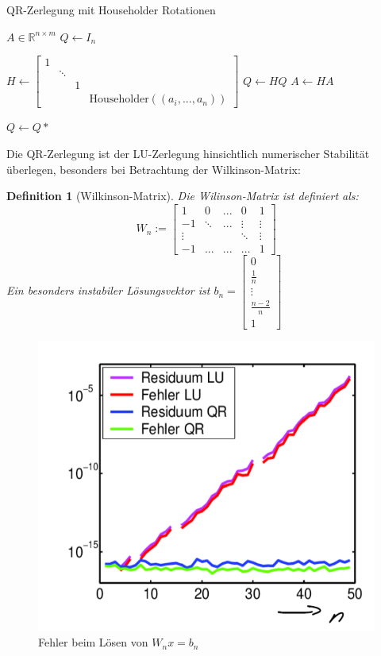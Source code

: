 \documentclass[10pt,a4paper]{article}
\newtheorem{definition}{Definition}
\begin{document}
	\begin{algorithm}
		\caption{QR-Zerlegung mit Householder Rotationen}
		\begin{algorithmic}
			\Require \Require $A \in \mathbb{R}^{n\times m}$
			\State $Q \leftarrow I_n$
			
			\State $H \leftarrow \begin{bmatrix}
				1 & & &    \\
				& \ddots & & \\
				& & 1 & \\
				& & & \text{Householder}((a_i, ..., a_n))
			\end{bmatrix}$
			\State $Q \leftarrow HQ$
			\State $A \leftarrow HA$
			
			\EndFor
			\State $Q \leftarrow Q*$
		\end{algorithmic}
	\end{algorithm}
	Die QR-Zerlegung ist der LU-Zerlegung hinsichtlich numerischer Stabilität überlegen, besonders bei Betrachtung der Wilkinson-Matrix:
	\begin{definition}[Wilkinson-Matrix]
		Die Wilinson-Matrix ist definiert als:
		$$W_n := \begin{bmatrix}
			1 & 0 & ... & 0 & 1\\
			-1 & \ddots & ... & \vdots & \vdots\\
			\vdots& & & \ddots & \vdots\\
			-1 & ... & ... & \dots&1
		\end{bmatrix}$$
		Ein besonders instabiler Lösungsvektor ist $b_n = \begin{bmatrix}
			0\\
			\frac{1}{n}\\
			\vdots\\
			\frac{n-2}{n}\\
			1
		\end{bmatrix}$
	\end{definition}
	\begin{figure}
		\centering
		\includegraphics{"FehlerWilkinson.png"}
		\caption{Fehler beim Lösen von $W_nx =b_n$}
	\end{figure}
\end{document}
